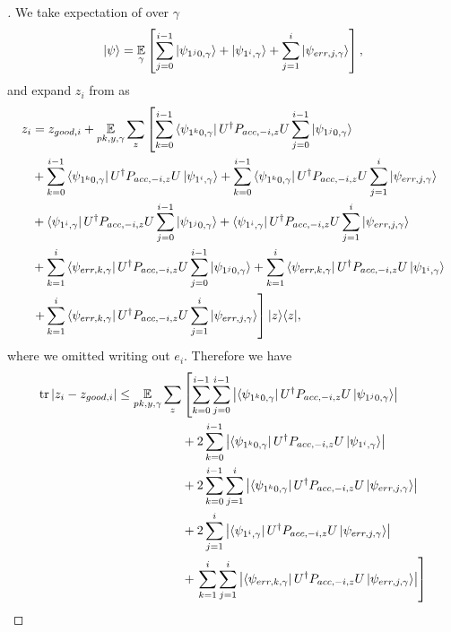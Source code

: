 \begin{proof}[]
	We take expectation of  over $\gamma$
	$$\ket{\psi}=\operatorname*{\mathbb{E}}_{\gamma}\left[
		\sum_{j=0}^{i-1} \ket{\psi_{1^j0,\gamma}} +\ket{\psi_{1^i,\gamma}} +\sum_{j=1}^{i}\ket{\psi_{err,j,\gamma}}
	\right],$$
	and expand $z_i$ from  as
	\begin{align}
		z_i &= z_{good,i}+ \operatorname*{\mathbb{E}}_{pk, y, \gamma} \sum_z \left[\sum_{k=0}^{i-1} \bra{\psi_{1^k0,\gamma}}U^\dag  P_{acc,-i,z}U   \sum_{j=0}^{i-1} \ket{\psi_{1^j0,\gamma}} \right. \nonumber \\
		&+
		\sum_{k=0}^{i-1} \bra{\psi_{1^k0,\gamma}}U^\dag  P_{acc,-i,z}U \ket{\psi_{1^i,\gamma}} +\sum_{k=0}^{i-1} \bra{\psi_{1^k0,\gamma}}U^\dag  P_{acc,-i,z}U\sum_{j=1}^{i}\ket{\psi_{err,j,\gamma}} \nonumber \\
		&+\bra{\psi_{1^i,\gamma}} U^\dag  P_{acc,-i,z}U \sum_{j=0}^{i-1} \ket{\psi_{1^j0,\gamma}} +\bra{\psi_{1^i,\gamma}} U^\dag  P_{acc,-i,z}U \sum_{j=1}^{i}\ket{\psi_{err,j,\gamma}}
		\nonumber \\
		&+ \sum_{k=1}^{i}\bra{\psi_{err,k,\gamma}} U^\dag  P_{acc,-i,z}U  \sum_{j=0}^{i-1} \ket{\psi_{1^j0,\gamma}} + \sum_{k=1}^{i}\bra{\psi_{err,k,\gamma}} U^\dag  P_{acc,-i,z}U \ket{\psi_{1^i,\gamma}}
		\nonumber \\
		&\left.    +\sum_{k=1}^{i}\bra{\psi_{err,k,\gamma}} U^\dag  P_{acc,-i,z}U \sum_{j=1}^{i}\ket{\psi_{err,j,\gamma}} \right] |z\rangle\langle z| , \nonumber     
	\end{align}
	where we omitted writing out $e_i$.
	Therefore we have
	\begin{align*}
		\tr|z_i-z_{good,i}|\leq \E_{pk, y, \gamma} \sum_z &\L[ \sum_{k=0}^{i-1} \sum_{j=0}^{i-1} \L| \bra{\psi_{1^k0,\gamma}}U^\dag  P_{acc,-i,z}U \ket{\psi_{1^j0,\gamma}} \R|\R.\\
		&+
		2 \sum_{k=0}^{i-1} \L|\bra{\psi_{1^k0,\gamma}}U^\dag  P_{acc,-i,z}U \ket{\psi_{1^i,\gamma}} \R| \\
		&+ 2 \sum_{k=0}^{i-1}\sum_{j=1}^{i}\L| \bra{\psi_{1^k0,\gamma}}U^\dag  P_{acc,-i,z}U\ket{\psi_{err,j,\gamma}}\R| \\   
		&+2 \sum_{j=1}^{i}\L|\bra{\psi_{1^i,\gamma}} U^\dag  P_{acc,-i,z}U \ket{\psi_{err,j,\gamma}}\R| \\
		&+\L. \sum_{k=1}^{i}\sum_{j=1}^{i}\L| \bra{\psi_{err,k,\gamma}} U^\dag  P_{acc,-i,z}U \ket{\psi_{err,j,\gamma}}\R| \R] \\ %
	\end{align*}

\end{proof}
